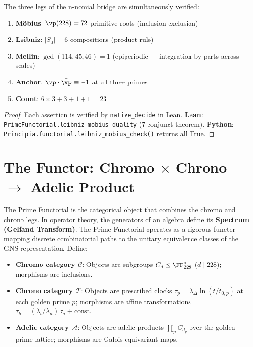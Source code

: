 \begin{theorem}
\label{thm:leibniz-mobius}
The three legs of the n-nomial bridge are simultaneously verified:
\begin{enumerate}[noitemsep]
\item \textbf{Möbius}: $\vp(228) = 72$ primitive roots (inclusion-exclusion)
\item \textbf{Leibniz}: $|S_3| = 6$ compositions (product rule)
\item \textbf{Mellin}: $\gcd(114, 45, 46) = 1$ (epiperiodic --- integration by parts across scales)
\item \textbf{Anchor}: $\vp \cdot \bar\vp \equiv -1$ at all three primes
\item \textbf{Count}: $6 \times 3 + 3 + 1 + 1 = 23$
\end{enumerate}
\end{theorem}

\begin{proof}
Each assertion is verified by \texttt{native\_decide} in Lean.
\textbf{Lean}: \texttt{PrimeFunctorial.leibniz\_mobius\_duality} (7-conjunct theorem).
\textbf{Python}: \texttt{Principia.functorial.leibniz\_mobius\_check()} returns all True.
\end{proof}


\section{The Functor: Chromo $\times$ Chrono $\to$ Adelic Product}
\label{sec:functor}

The Prime Functorial is the categorical object that combines the chromo and chrono legs. In operator theory, the generators of an algebra define its \textbf{Spectrum (Gelfand Transform)}. The Prime Functorial operates as a rigorous functor mapping discrete combinatorial paths to the unitary equivalence classes of the GNS representation. Define:
\begin{itemize}[noitemsep]
\item \textbf{Chromo category $\mathcal{C}$}: Objects are subgroups $C_d \leq \FF_{229}^*$ ($d \mid 228$); morphisms are inclusions.
\item \textbf{Chrono category $\mathcal{T}$}: Objects are prescribed clocks $\tau_p = \lambda_\Delta \ln(t/t_{0,p})$ at each golden prime $p$; morphisms are affine transformations $\tau_b = (\lambda_b/\lambda_a)\,\tau_a + \mathrm{const}$.
\item \textbf{Adelic category $\mathcal{A}$}: Objects are adelic products $\prod_p C_{d_p}$ over the golden prime lattice; morphisms are Galois-equivariant maps.
\end{itemize}

